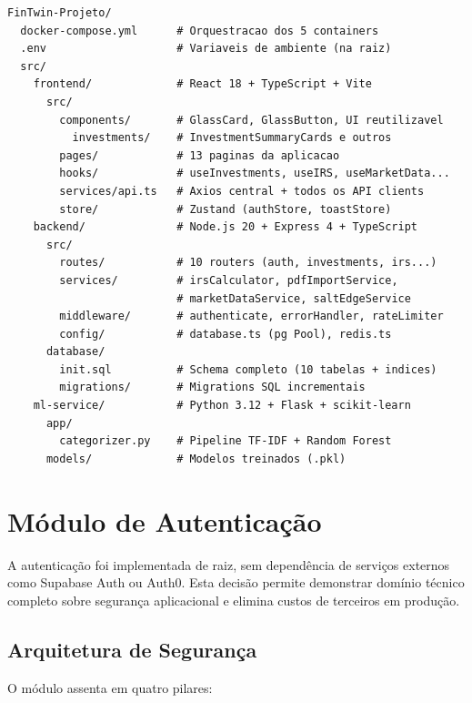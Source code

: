 \begin{lstlisting}[caption={Estrutura de diretórios do projeto (real).},label={lst:structure}]
FinTwin-Projeto/
  docker-compose.yml      # Orquestracao dos 5 containers
  .env                    # Variaveis de ambiente (na raiz)
  src/
    frontend/             # React 18 + TypeScript + Vite
      src/
        components/       # GlassCard, GlassButton, UI reutilizavel
          investments/    # InvestmentSummaryCards e outros
        pages/            # 13 paginas da aplicacao
        hooks/            # useInvestments, useIRS, useMarketData...
        services/api.ts   # Axios central + todos os API clients
        store/            # Zustand (authStore, toastStore)
    backend/              # Node.js 20 + Express 4 + TypeScript
      src/
        routes/           # 10 routers (auth, investments, irs...)
        services/         # irsCalculator, pdfImportService,
                          # marketDataService, saltEdgeService
        middleware/       # authenticate, errorHandler, rateLimiter
        config/           # database.ts (pg Pool), redis.ts
      database/
        init.sql          # Schema completo (10 tabelas + indices)
        migrations/       # Migrations SQL incrementais
    ml-service/           # Python 3.12 + Flask + scikit-learn
      app/
        categorizer.py    # Pipeline TF-IDF + Random Forest
      models/             # Modelos treinados (.pkl)
\end{lstlisting}


\section{Módulo de Autenticação}
\label{sec:impl-auth}

A autenticação foi implementada de raiz, sem dependência de serviços externos como Supabase Auth ou Auth0. Esta decisão permite demonstrar domínio técnico completo sobre segurança aplicacional e elimina custos de terceiros em produção.

\subsection{Arquitetura de Segurança}

O módulo assenta em quatro pilares:

